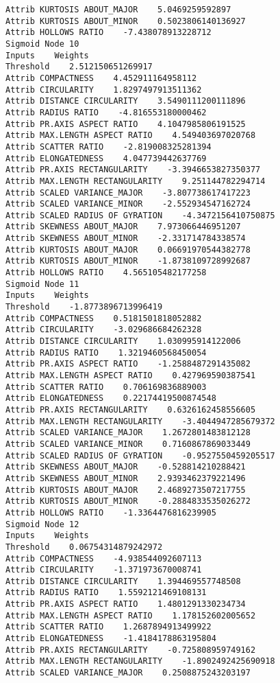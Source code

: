 \documentclass[
	article,			%
	11pt,				%
	oneside,			%
	a4paper,			%
	english,			%
	brazil,				%
	sumario=tradicional
	]{abntex2}
\begin{document}
\begin{lstlisting}
Attrib KURTOSIS ABOUT_MAJOR    5.0469259592897
Attrib KURTOSIS ABOUT_MINOR    0.5023806140136927
Attrib HOLLOWS RATIO    -7.438078913228712
Sigmoid Node 10
Inputs    Weights
Threshold    2.512150651269917
Attrib COMPACTNESS    4.452911164958112
Attrib CIRCULARITY    1.8297497913511362
Attrib DISTANCE CIRCULARITY    3.5490111200111896
Attrib RADIUS RATIO    -4.816553180000462
Attrib PR.AXIS ASPECT RATIO    4.1047985806191525
Attrib MAX.LENGTH ASPECT RATIO    4.549403697020768
Attrib SCATTER RATIO    -2.819008325281394
Attrib ELONGATEDNESS    4.047739442637769
Attrib PR.AXIS RECTANGULARITY    -3.3946653827350377
Attrib MAX.LENGTH RECTANGULARITY    9.251144782294714
Attrib SCALED VARIANCE_MAJOR    -3.807738617417223
Attrib SCALED VARIANCE_MINOR    -2.552934547162724
Attrib SCALED RADIUS OF GYRATION    -4.3472156410750875
Attrib SKEWNESS ABOUT_MAJOR    7.973066446951207
Attrib SKEWNESS ABOUT_MINOR    -2.331714784338574
Attrib KURTOSIS ABOUT_MAJOR    0.06691970544382778
Attrib KURTOSIS ABOUT_MINOR    -1.8738109728992687
Attrib HOLLOWS RATIO    4.565105482177258
Sigmoid Node 11
Inputs    Weights
Threshold    -1.8773896713996419
Attrib COMPACTNESS    0.5181501818052882
Attrib CIRCULARITY    -3.029686684262328
Attrib DISTANCE CIRCULARITY    1.030995914122006
Attrib RADIUS RATIO    1.3219460568450054
Attrib PR.AXIS ASPECT RATIO    -1.2588487291435082
Attrib MAX.LENGTH ASPECT RATIO    0.427969590387541
Attrib SCATTER RATIO    0.706169836889003
Attrib ELONGATEDNESS    0.22174419500874548
Attrib PR.AXIS RECTANGULARITY    0.6326162458556605
Attrib MAX.LENGTH RECTANGULARITY    -3.4044947285679372
Attrib SCALED VARIANCE_MAJOR    1.2672801483812128
Attrib SCALED VARIANCE_MINOR    0.7160867869033449
Attrib SCALED RADIUS OF GYRATION    -0.9527550459205517
Attrib SKEWNESS ABOUT_MAJOR    -0.528814210288421
Attrib SKEWNESS ABOUT_MINOR    2.9393462379221496
Attrib KURTOSIS ABOUT_MAJOR    2.4689273507217755
Attrib KURTOSIS ABOUT_MINOR    -0.2884833535026272
Attrib HOLLOWS RATIO    -1.3364476816239905
Sigmoid Node 12
Inputs    Weights
Threshold    0.06754314879242972
Attrib COMPACTNESS    -4.938544092607113
Attrib CIRCULARITY    -1.371973670008741
Attrib DISTANCE CIRCULARITY    1.394469557748508
Attrib RADIUS RATIO    1.5592121469108131
Attrib PR.AXIS ASPECT RATIO    1.4801291330234734
Attrib MAX.LENGTH ASPECT RATIO    1.178152602005652
Attrib SCATTER RATIO    1.2687894913499922
Attrib ELONGATEDNESS    -1.4184178863195804
Attrib PR.AXIS RECTANGULARITY    -0.725808959749162
Attrib MAX.LENGTH RECTANGULARITY    -1.8902492425690918
Attrib SCALED VARIANCE_MAJOR    0.2508875243203197

\end{lstlisting}
\end{document}
